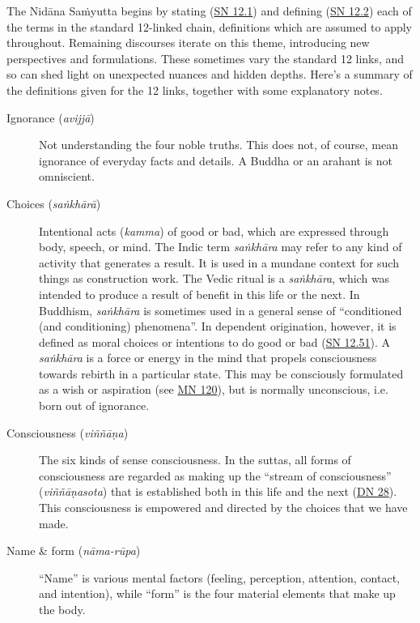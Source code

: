 \documentclass[12pt,openany]{book}%
\begin{document}
The \textsanskrit{Nidāna} \textsanskrit{Saṁyutta} begins by stating (\href{https://suttacentral.net/sn12.1}{SN 12.1}) and defining (\href{https://suttacentral.net/sn12.2}{SN 12.2}) each of the terms in the standard 12-linked chain, definitions which are assumed to apply throughout. Remaining discourses iterate on this theme, introducing new perspectives and formulations. These sometimes vary the standard 12 links, and so can shed light on unexpected nuances and hidden depths. Here’s a summary of the definitions given for the 12 links, together with some explanatory notes.

\begin{description}%
\item[Ignorance (\textit{\textsanskrit{avijjā}})] Not understanding the four noble truths.
This does not, of course, mean ignorance of everyday facts and details. A Buddha or an arahant is not omniscient.%
\item[Choices (\textit{\textsanskrit{saṅkhārā}})] Intentional acts (\textit{kamma}) of good or bad, which are expressed through body, speech, or mind.
The Indic term \emph{\textsanskrit{saṅkhāra}} may refer to any kind of activity that generates a result. It is used in a mundane context for such things as construction work. The Vedic ritual is a \emph{\textsanskrit{saṅkhāra}}, which was intended to produce a result of benefit in this life or the next. In Buddhism, \emph{\textsanskrit{saṅkhāra}} is sometimes used in a general sense of “conditioned (and conditioning) phenomena”. In dependent origination, however, it is defined as moral choices or intentions to do good or bad (\href{https://suttacentral.net/sn12.51}{SN 12.51}). A \emph{\textsanskrit{saṅkhāra}} is a force or energy in the mind that propels consciousness towards rebirth in a particular state. This may be consciously formulated as a wish or aspiration (see \href{https://suttacentral.net/mn120}{MN 120}), but is normally unconscious, i.e. born out of ignorance.%
\item[Consciousness (\textit{\textsanskrit{viññāṇa}})] The six kinds of sense consciousness.
In the suttas, all forms of consciousness are regarded as making up the “stream of consciousness” (\textit{\textsanskrit{viññāṇasota}}) that is established both in this life and the next (\href{https://suttacentral.net/dn28}{DN 28}). This consciousness is empowered and directed by the choices that we have made.%
\item[Name \& form (\textit{\textsanskrit{nāma}-\textsanskrit{rūpa}})] “Name” is various mental factors (feeling, perception, attention, contact, and intention), while “form” is the four material elements that make up the body.

\end{description}
\end{document}

